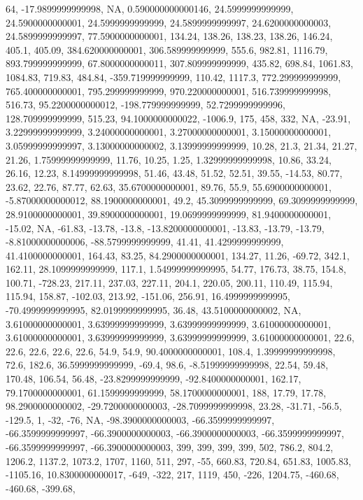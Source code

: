 \documentclass[
]{article}
\begin{document}
64, -17.9899999999998, NA, 0.590000000000146, 24.5999999999999,
24.5900000000001, 24.5999999999999, 24.5899999999997, 24.6200000000003,
24.5899999999997, 77.5900000000001, 134.24, 138.26, 138.23, 138.26,
146.24, 405.1, 405.09, 384.620000000001, 306.589999999999, 555.6,
982.81, 1116.79, 893.799999999999, 67.8000000000011, 307.809999999999,
435.82, 698.84, 1061.83, 1084.83, 719.83, 484.84, -359.719999999999,
110.42, 1117.3, 772.299999999999, 765.400000000001, 795.299999999999,
970.220000000001, 516.739999999998, 516.73, 95.2200000000012,
-198.779999999999, 52.7299999999996, 128.709999999999, 515.23,
94.1000000000022, -1006.9, 175, 458, 332, NA, -23.91, 3.22999999999999,
3.24000000000001, 3.27000000000001, 3.15000000000001, 3.05999999999997,
3.13000000000002, 3.13999999999999, 10.28, 21.3, 21.34, 21.27, 21.26,
1.75999999999999, 11.76, 10.25, 1.25, 1.32999999999998, 10.86, 33.24,
26.16, 12.23, 8.14999999999998, 51.46, 43.48, 51.52, 52.51, 39.55,
-14.53, 80.77, 23.62, 22.76, 87.77, 62.63, 35.6700000000001, 89.76,
55.9, 55.6900000000001, -5.87000000000012, 88.1900000000001, 49.2,
45.3099999999999, 69.3099999999999, 28.9100000000001, 39.8900000000001,
19.0699999999999, 81.9400000000001, -15.02, NA, -61.83, -13.78, -13.8,
-13.8200000000001, -13.83, -13.79, -13.79, -8.81000000000006,
-88.5799999999999, 41.41, 41.4299999999999, 41.4100000000001, 164.43,
83.25, 84.2900000000001, 134.27, 11.26, -69.72, 342.1, 162.11,
28.1099999999999, 117.1, 1.54999999999995, 54.77, 176.73, 38.75, 154.8,
100.71, -728.23, 217.11, 237.03, 227.11, 204.1, 220.05, 200.11, 110.49,
115.94, 115.94, 158.87, -102.03, 213.92, -151.06, 256.91,
16.4999999999995, -70.4999999999995, 82.0199999999995, 36.48,
43.5100000000002, NA, 3.61000000000001, 3.63999999999999,
3.63999999999999, 3.61000000000001, 3.61000000000001, 3.63999999999999,
3.63999999999999, 3.61000000000001, 22.6, 22.6, 22.6, 22.6, 22.6, 54.9,
54.9, 90.4000000000001, 108.4, 1.39999999999998, 72.6, 182.6,
36.5999999999999, -69.4, 98.6, -8.51999999999998, 22.54, 59.48, 170.48,
106.54, 56.48, -23.8299999999999, -92.8400000000001, 162.17,
79.1700000000001, 61.1599999999999, 58.1700000000001, 188, 17.79, 17.78,
98.2900000000002, -29.7200000000003, -28.7099999999998, 23.28, -31.71,
-56.5, -129.5, 1, -32, -76, NA, -98.3900000000003, -66.3599999999997,
-66.3599999999997, -66.3900000000003, -66.3900000000003,
-66.3599999999997, -66.3599999999997, -66.3900000000003, 399, 399, 399,
399, 502, 786.2, 804.2, 1206.2, 1137.2, 1073.2, 1707, 1160, 511, 297,
-55, 660.83, 720.84, 651.83, 1005.83, -1105.16, 10.8300000000017, -649,
-322, 217, 1119, 450, -226, 1204.75, -460.68, -460.68, -399.68,
\end{document}
